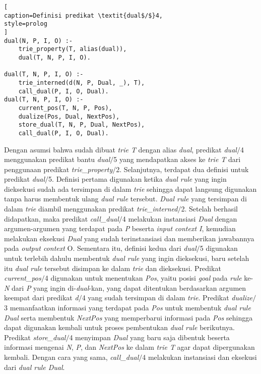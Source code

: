 \begin{lstlisting}[
caption=Definisi predikat \textit{dual$/$}4,
style=prolog
]
dual(N, P, I, O) :-
	trie_property(T, alias(dual)),
	dual(T, N, P, I, O).
	
dual(T, N, P, I, O) :-
	trie_interned(d(N, P, Dual, _), T),
	call_dual(P, I, O, Dual).
dual(T, N, P, I, O) :-
	current_pos(T, N, P, Pos),
	dualize(Pos, Dual, NextPos),
	store_dual(T, N, P, Dual, NextPos),
	call_dual(P, I, O, Dual).
\end{lstlisting}

Dengan asumsi bahwa sudah dibuat \textit{trie T} dengan alias \textit{dual}, predikat \textit{dual$/$}4 menggunakan predikat bantu \textit{dual$/$}5 yang mendapatkan akses ke \textit{trie T} dari penggunaan predikat \textit{trie\_property$/$}2. Selanjutnya, terdapat dua definisi untuk predikat \textit{dual$/$}5. Definisi pertama digunakan ketika \textit{dual rule} yang ingin dieksekusi sudah ada tersimpan di dalam \textit{trie} sehingga dapat langsung digunakan tanpa harus membentuk ulang \textit{dual rule} tersebut. \textit{Dual rule} yang tersimpan di dalam \textit{trie} diambil menggunakan predikat \textit{trie\_interned$/$}2. Setelah berhasil didapatkan, maka predikat \textit{call\_dual$/$}4 melakukan instansiasi \textit{Dual} dengan argumen-argumen yang terdapat pada \textit{P} beserta \textit{input context I}, kemudian melakukan eksekusi \textit{Dual} yang sudah terinstansiasi dan memberikan jawabannya pada \textit{output context} O. Sementara itu, definisi kedua dari \textit{dual$/$}5 digunakan untuk terlebih dahulu membentuk \textit{dual rule} yang ingin dieksekusi, baru setelah itu \textit{dual rule} tersebut disimpan ke dalam \textit{trie} dan dieksekusi. Predikat \textit{current\_pos$/$}4 digunakan untuk menentukan \textit{Pos}, yaitu posisi \textit{goal} pada \textit{rule} ke-\textit{N} dari \textit{P} yang ingin di-\textit{dual}-kan, yang dapat ditentukan berdasarkan argumen keempat dari predikat \textit{d$/$}4 yang sudah tersimpan di dalam \textit{trie}. Predikat \textit{dualize$/$}3 memanfaatkan informasi yang terdapat pada \textit{Pos} untuk membentuk \textit{dual rule Dual} serta membentuk \textit{NextPos } yang memperbarui informasi pada \textit{Pos} sehingga dapat digunakan kembali untuk proses pembentukan \textit{dual rule} berikutnya. Predikat \textit{store\_dual$/$}4 menyimpan \textit{Dual} yang baru saja dibentuk beserta informasi mengenai \textit{N}, \textit{P}, dan \textit{NextPos} ke dalam \textit{trie T} agar dapat dipergunakan kembali. Dengan cara yang sama, \textit{call\_dual$/$}4 melakukan instansiasi dan eksekusi dari \textit{dual rule Dual}.


